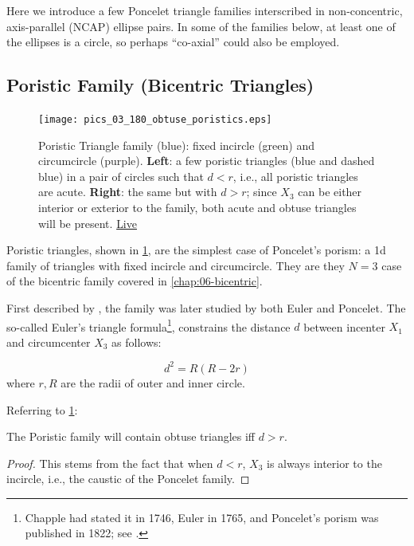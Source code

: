 Here we introduce a few Poncelet triangle families interscribed in non-concentric, axis-parallel (NCAP) ellipse pairs. In some of the families below, at least one of the ellipses is a circle, so perhaps ``co-axial'' could also be employed.

\subsection{Poristic Family (Bicentric Triangles)}

\begin{figure}
    \centering
    \texttt{[image: 
    pics\_03\_180\_obtuse\_poristics.eps]}
    \caption{Poristic Triangle family (blue): fixed incircle (green) and circumcircle (purple). \textbf{Left}: a few poristic triangles (blue and dashed blue) in a pair of circles such that $d<r$, i.e.,  all poristic triangles are acute. \textbf{Right}: the same but with $d>r$; since $X_3$ can be either interior or exterior to the family, both acute and obtuse triangles will be present. \href{https://bit.ly/3bg19iD}{Live}}
    \label{fig:03-poristic obtuse}
\end{figure}

Poristic triangles, shown in \cref{fig:03-poristic obtuse}, are the simplest case of Poncelet's porism: a 1d family of triangles with fixed incircle and circumcircle. They are they $N=3$ case of the bicentric family covered in \cref{chap:06-bicentric}.

First described by \cite{chapple1746-poristics}, the family was later studied by both Euler and Poncelet. The so-called Euler's triangle formula\footnote{Chapple had stated it in 1746, Euler in 1765, and Poncelet's porism was published in 1822; see \cite{centina15}.}, constrains the distance $d$ between incenter $X_1$ and circumcenter $X_3$ as follows:

\begin{equation}
d^2=R(R-2 r)
\label{eq:03-euler-poristic}
\end{equation}
where $r,R$ are the radii of outer and inner circle.

Referring to \cref{fig:03-poristic obtuse}:

\begin{proposition}
The Poristic family will contain obtuse triangles iff $d>r$.
\end{proposition}

\begin{proof}
This stems from the fact that when $d<r$, $X_3$ is always interior to the incircle, i.e., the caustic of the Poncelet family. 
\end{proof}

